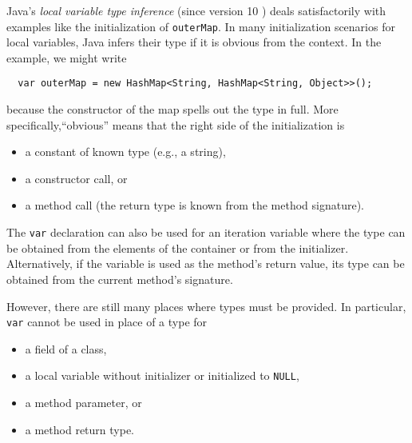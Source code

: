 Java's \emph{local variable type inference} (since version 10
\cite{java-version-10}) deals
satisfactorily with examples like the initialization of
\lstinline{outerMap}. 
In many initialization scenarios for local variables, Java infers their type
if it is obvious from the context. In the
example, we might write
\begin{lstlisting}
  var outerMap = new HashMap<String, HashMap<String, Object>>();
\end{lstlisting}
because the constructor of the map spells out the type in
full. More specifically,``obvious'' means that the right side of the initialization is
\begin{itemize}
\item a constant of known type (e.g., a string),
\item a constructor call, or
\item a method call (the return type is known from the method
  signature).
\end{itemize}
The \lstinline{var} declaration can also be used for an iteration
variable where the type can be obtained from the elements of the
container or from the initializer.
Alternatively, if the variable is used as the method's return value,
its type can be obtained from the current method's signature.

However, there are still many places where types must be provided. In
particular, \lstinline{var} cannot be used in place of a type for
\begin{itemize}
\item a field of a class,
\item a local variable without initializer or initialized to \lstinline{NULL},
\item a method parameter, or
\item a method return type.
\end{itemize}

